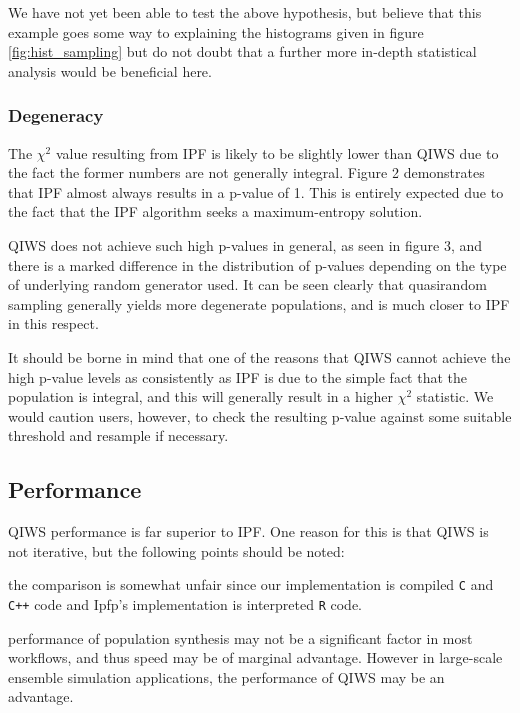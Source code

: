 \documentclass{JASSS}
\begin{document}
We have not yet been able to test the above hypothesis, but believe that this example goes some way to explaining the histograms given in figure \ref{fig:hist_sampling} but do not doubt that a further more in-depth statistical analysis would be beneficial here.

\subsubsection{Degeneracy}\label{degeneracy}

The \(\chi^2\) value resulting from IPF is likely to be slightly lower
than QIWS due to the fact the former numbers are not generally integral.
Figure 2 demonstrates that IPF almost always results in a p-value of 1.
This is entirely expected due to the fact that the IPF algorithm seeks a 
maximum-entropy solution.

QIWS does not achieve such high p-values in general, as seen in figure
3, and there is a marked difference in the distribution of p-values
depending on the type of underlying random generator used. It can be
seen clearly that quasirandom sampling generally yields more degenerate
populations, and is much closer to IPF in this respect.

It should be borne in mind that one of the reasons that QIWS cannot
achieve the high p-value levels as consistently as IPF is due to the
simple fact that the population is integral, and this will generally
result in a higher \(\chi^2\) statistic. We would caution users,
however, to check the resulting p-value against some suitable threshold
and resample if necessary.

\subsection{Performance}\label{performance-1}

QIWS performance is far superior to IPF. One reason for this is that
QIWS is not iterative, but the following points should be noted:

\begin{itemize*}
\item
  the comparison is somewhat unfair since our implementation is compiled
  \texttt{C} and \texttt{C++} code and Ipfp's implementation is
  interpreted \texttt{R} code.
\item
  performance of population synthesis may not be a significant factor in
  most workflows, and thus speed may be of marginal advantage. However
  in large-scale ensemble simulation applications, the performance of
  QIWS may be an advantage.
\end{itemize*}
\end{document}
